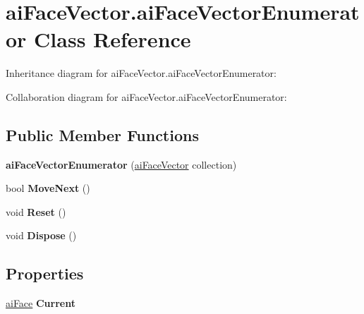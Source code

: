 \hypertarget{classai_face_vector_1_1ai_face_vector_enumerator}{\section{ai\+Face\+Vector.\+ai\+Face\+Vector\+Enumerator Class Reference}
\label{classai_face_vector_1_1ai_face_vector_enumerator}
}


Inheritance diagram for ai\+Face\+Vector.\+ai\+Face\+Vector\+Enumerator\+:


Collaboration diagram for ai\+Face\+Vector.\+ai\+Face\+Vector\+Enumerator\+:
\subsection*{Public Member Functions}
\begin{DoxyCompactItemize}
\item 
\hypertarget{classai_face_vector_1_1ai_face_vector_enumerator_a8edf36be18d7bb80eb6ae41f33fcfe90}{{\bfseries ai\+Face\+Vector\+Enumerator} (\hyperlink{classai_face_vector}{ai\+Face\+Vector} collection)}\label{classai_face_vector_1_1ai_face_vector_enumerator_a8edf36be18d7bb80eb6ae41f33fcfe90}

\item 
\hypertarget{classai_face_vector_1_1ai_face_vector_enumerator_a80276c38e6e687702a95449eac2b625e}{bool {\bfseries Move\+Next} ()}\label{classai_face_vector_1_1ai_face_vector_enumerator_a80276c38e6e687702a95449eac2b625e}

\item 
\hypertarget{classai_face_vector_1_1ai_face_vector_enumerator_ae9865c0e882591c4d8e2af22f753cb91}{void {\bfseries Reset} ()}\label{classai_face_vector_1_1ai_face_vector_enumerator_ae9865c0e882591c4d8e2af22f753cb91}

\item 
\hypertarget{classai_face_vector_1_1ai_face_vector_enumerator_a5c17d0bba4fe4361dafbe55fe33cf85b}{void {\bfseries Dispose} ()}\label{classai_face_vector_1_1ai_face_vector_enumerator_a5c17d0bba4fe4361dafbe55fe33cf85b}

\end{DoxyCompactItemize}
\subsection*{Properties}
\begin{DoxyCompactItemize}
\item 
\hypertarget{classai_face_vector_1_1ai_face_vector_enumerator_a4faf535adfd0aced4bd60a5c647495b5}{\hyperlink{structai_face}{ai\+Face} {\bfseries Current}}\label{classai_face_vector_1_1ai_face_vector_enumerator_a4faf535adfd0aced4bd60a5c647495b5}

\end{DoxyCompactItemize}


